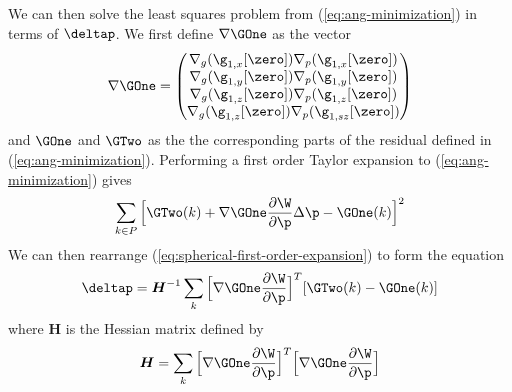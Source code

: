 We can then solve the least squares problem from (\ref{eq:ang-minimization}) in terms of $\deltap$. We first define $\nabla \GOne$ as the vector
\begin{equation}\label{eq:spherical-nabla-g1}
    \nabla \GOne = \begin{pmatrix}
                         \nabla_g (\g_{1,x}[\zero]) \nabla_p (\g_{1,x}[\zero]) \\
                         \nabla_g (\g_{1,y}[\zero]) \nabla_p (\g_{1,y}[\zero]) \\
                         \nabla_g (\g_{1,z}[\zero]) \nabla_p (\g_{1,z}[\zero]) \\
                         \nabla_g (\g_{1,z}[\zero]) \nabla_p (\g_{1,sz}[\zero])
                    \end{pmatrix}
\end{equation}
and $\GOne$ and $\GTwo$ as the the corresponding parts of the residual defined in (\ref{eq:ang-minimization}). Performing a first order Taylor expansion to (\ref{eq:ang-minimization}) gives
\begin{equation}\label{eq:spherical-first-order-expansion}
    \sum_{k \in P} \Big[ \GTwo(k) + \nabla \GOne \frac{\partial \W}{\partial \p} \Delta \p - \GOne(k) \Big]^2
\end{equation}
We can then rearrange (\ref{eq:spherical-first-order-expansion}) to form the equation
\begin{equation}\label{eq:spherical-delta-p}
    \deltap = \boldsymbol{H}^{-1} \sum_k \Big[ \nabla \GOne \frac{\partial \W}{\partial \p} \Big]^T [\GTwo(k) - \GOne(k)]
\end{equation}
where $\boldsymbol{H}$ is the Hessian matrix defined by
\begin{equation}\label{eq:spherical-hessian}
    \boldsymbol{H} = \sum_k \Big[ \nabla \GOne \frac{\partial \W}{\partial \p} \Big]^T \Big[ \nabla \GOne \frac{\partial \W}{\partial \p} \Big]
\end{equation}
